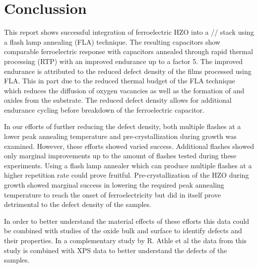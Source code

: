 \documentclass[11pt,twoside]{eitExjobb}
\begin{document}
\chapter{Conclussion}\label{chap:conc}

This report shows successful integration of ferroelectric HZO into a
// stack using a flash lamp annealing (FLA) technique. The
resulting capacitors show comparable ferroelectric response with capacitors
annealed through rapid thermal processing (RTP) with an improved endurance up
to a factor 5. The improved endurance is attributed to the reduced defect
density of the films processed using FLA. This in part due to the reduced
thermal budget of the FLA technique which reduces the diffusion of oxygen
vacancies as well as the formation of  and  oxides from the
substrate.\cite{kang2016structural} The reduced defect density allows for
additional endurance cycling before breakdown of the ferroelectric capacitor.

In our efforts of further reducing the defect density, both multiple flashes at
a lower peak annealing temperature and pre-crystallization during growth was
examined. However, these efforts showed varied success. Additional flashes
showed only marginal improvements up to the amount of flashes tested during
these experiments. Using a flash lamp annealer which can produce multiple
flashes at a higher repetition rate could prove fruitful. Pre-crystallization
of the HZO during growth showed marginal success in lowering the required peak
annealing temperature to reach the onset of ferroelectricity but did in itself
prove detrimental to the defect density of the samples.

In order to better understand the material effects of these efforts this data
could be combined with studies of the oxide bulk and surface to identify
defects and their properties. In a complementary study by R. Athle et al the
data from this study is combined with XPS data to better understand the
defects of the samples.\cite{athle2022improved}





\appendix
\end{document}
